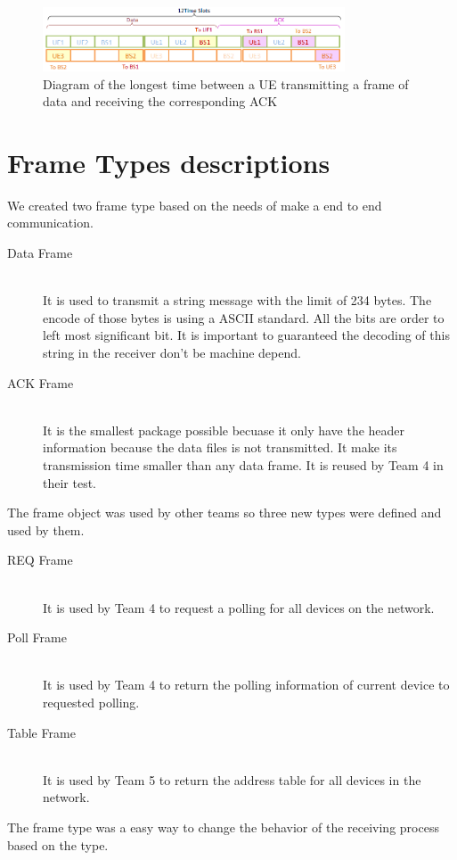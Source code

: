 \begin{figure}[ht]
    \centering
    \includegraphics[width=0.8\textwidth]{ACK_timeout_long.PNG}
    \caption{Diagram of the longest time between a UE transmitting a frame of data and receiving the corresponding ACK}
    \label{fig:ACKtimelong}
\end{figure}







\section{Frame Types descriptions}
We created two frame type based on the needs of make a end to end communication.

\begin{description}
  \item[Data Frame] \hfill \\
  It is used to transmit a string message with the limit of 234 bytes. The encode of those bytes is using a ASCII standard. All the bits are order to left most significant bit.
	It is important to guaranteed the decoding of this string in the receiver don’t be machine depend. 
	
  \item[ACK Frame] \hfill \\
  It is the smallest package possible becuase it only have the header information because the data files is not transmitted. It make its transmission time smaller than any data frame. It is reused by Team 4 in their test. 
\end{description}

The frame object was used by other teams so three new types were defined and used by them.
\begin{description}
  \item[REQ Frame] \hfill \\
It is used by Team 4 to request a polling for all devices on the network. 
	
  \item[Poll Frame] \hfill \\
 It is used by Team 4 to return the polling information of current device to requested polling. 
  \item[Table Frame] \hfill \\
 It is used by Team 5 to return the address table for all devices in the network.

\end{description} 

The frame type was a easy way to change the behavior of the receiving process based on the type.  



